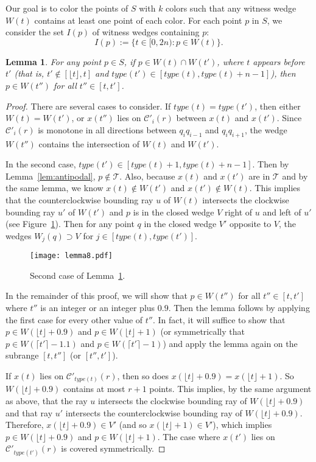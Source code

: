 \documentclass[english,11pt]{article}
\newtheorem{lemma}{Lemma}
\newcommand{\bigc}{\mathcal C}
\newcommand{\bigt}{\mathcal T}
\begin{document}
Our goal is to color the points of $S$ with $k$ colors such that any witness wedge $W(t)$ contains at least one point of each color.
For each point $p$ in $S$, we consider the set $I(p)$ of witness wedges containing $p$:
$$
I(p) := \{ t\in [0,2n) : p\in W (t) \} .
$$

\begin{lemma}
\label{lem:oneinterval}
For any point $p\in S$, if $p\in W(t) \cap W(t')$, where $t$ appears
before $t'$ (that is,  $t'\notin [\lfloor t \rfloor,t]$ and 
$type(t')\in [type(t),type(t){+}n{-}1]$), then $p\in W(t'')$ for all $t''\in[t,t']$.
\end{lemma}
\begin{proof}
There are several cases to consider. If $type(t)=type(t')$, then either
$W(t)=W(t')$, or $x(t'')$ lies on $\bigc'_i(r)$ between $x(t)$
and $x(t')$. Since $\bigc'_i(r)$ is  monotone in all directions between
$q_iq_{i{-}1}$ and $q_iq_{i{+}1}$, the wedge $W(t'')$ contains the
intersection of $W(t)$ and $W(t')$.


In the second case, $type(t') \in [type(t){+}1,type(t){+}n{-}1]$. 
Then by Lemma~\ref{lem:antipodal}, $p\notin \bigt$. Also, because
$x(t)$ and $x(t')$ are in $\bigt$ and by the same lemma, we know
$x(t)\notin W(t')$ and $x(t')\notin W(t)$. This implies that the
counterclockwise bounding ray $u$ of $W(t)$ intersects the clockwise
bounding ray $u'$ of $W(t')$ and $p$ is in the closed wedge $V$ right
of $u$ and left of $u'$ (see Figure~\ref{fig:lemma8}). Then for any point $q$ in the closed wedge
$V'$ opposite to $V$, the wedges $W_j(q)\supset V$ for
$j\in[type(t),type(t')]$.  

\begin{figure}[htb]
\begin{center}
\texttt{[image: lemma8.pdf]}
\end{center}
\caption{\label{fig:lemma8}Second case of Lemma~\ref{lem:oneinterval}.}
\end{figure}

In the remainder of this proof, we will show that $p\in W(t'')$ for
all $t''\in [t,t']$ where $t''$ is an integer or an integer plus
$0.9$. Then the lemma follows by applying the first case for every
other value of $t''$.
In fact, it will suffice to show that $p\in W(\lfloor t \rfloor {+}0.9)$
and $p\in W(\lfloor t \rfloor {+}1)$ (or symmetrically that 
$p\in W(\lceil t' \rceil {-}1.1)$ and $p\in W(\lceil t' \rceil {-}1)$) and
apply the lemma again on the subrange $[t,t'']$ (or $[t'',t']$).

If $x(t)$ lies on $\bigc'_{type(t)}(r)$, then so does 
$x(\lfloor t\rfloor{+}0.9) = x(\lfloor t\rfloor{+}1)$. 
So $W(\lfloor t\rfloor{+}0.9)$ contains at most $r{+}1$ points. This
implies, by the same argument as above, that the ray $u$ intersects
the clockwise bounding ray of $W(\lfloor t\rfloor{+}0.9)$ and that ray
$u'$ intersects the counterclockwise bounding ray of 
$W(\lfloor t\rfloor{+}0.9)$. Therefore, 
$x(\lfloor t\rfloor{+}0.9)\in V'$ 
(and so $x(\lfloor t\rfloor{+}1)\in V'$), which implies 
$p\in W(\lfloor t\rfloor{+}0.9)$ and
$p\in W(\lfloor t\rfloor{+}1)$. 
The case where $x(t')$ lies on $\bigc'_{type(t')}(r)$ is covered symmetrically.


\end{proof}
\end{document}

